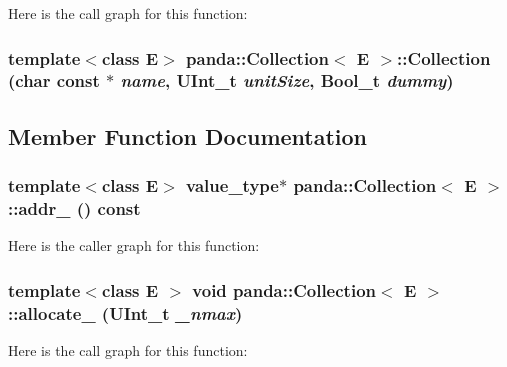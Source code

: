Here is the call graph for this function:\hypertarget{classpanda_1_1Collection_aba5674236155e6763257004ca1fa1a26}{
\subsubsection[{Collection}]{\setlength{\rightskip}{0pt plus 5cm}template$<$class E$>$ {\bf panda::Collection}$<$ E $>$::{\bf Collection} (char const $\ast$ {\em name}, \/  UInt\_\-t {\em unitSize}, \/  Bool\_\-t {\em dummy})}}
\label{classpanda_1_1Collection_aba5674236155e6763257004ca1fa1a26}


\subsection{Member Function Documentation}
\hypertarget{classpanda_1_1Collection_a24157825ebc9add7825e51ba47f1bd97}{
\subsubsection[{addr\_\-}]{\setlength{\rightskip}{0pt plus 5cm}template$<$class E$>$ {\bf value\_\-type}$\ast$ {\bf panda::Collection}$<$ E $>$::addr\_\- () const}}
\label{classpanda_1_1Collection_a24157825ebc9add7825e51ba47f1bd97}


Here is the caller graph for this function:\hypertarget{classpanda_1_1Collection_af6d52087e85607c91a6bd6400185442a}{
\subsubsection[{allocate\_\-}]{\setlength{\rightskip}{0pt plus 5cm}template$<$class E $>$ void {\bf panda::Collection}$<$ E $>$::allocate\_\- (UInt\_\-t {\em \_\-nmax})}}
\label{classpanda_1_1Collection_af6d52087e85607c91a6bd6400185442a}


Here is the call graph for this function:

